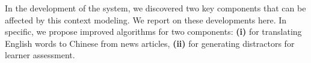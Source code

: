 In the development of the system, we discovered two key components
that can be affected by this context modeling.  We report on these
developments here. In specific, we propose improved algorithms for
two components: \textbf{(i)} for translating English words to Chinese
from news articles, \textbf{(ii)} for generating distractors 
for learner assessment.





